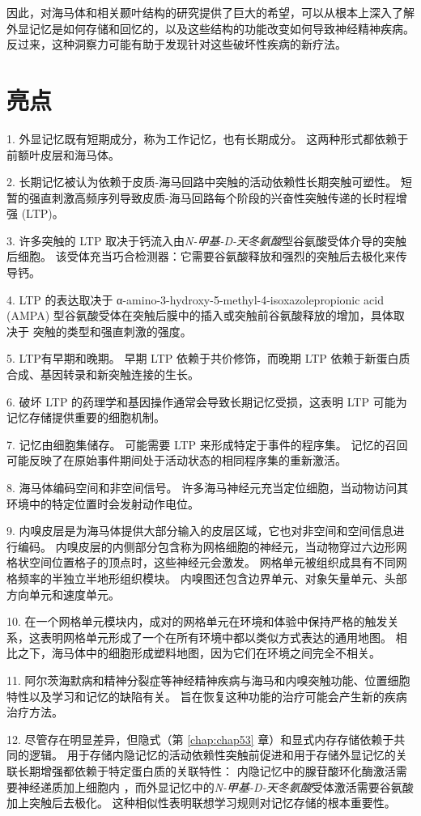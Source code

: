 因此，对海马体和相关颞叶结构的研究提供了巨大的希望，可以从根本上深入了解外显记忆是如何存储和回忆的，以及这些结构的功能改变如何导致神经精神疾病。
反过来，这种洞察力可能有助于发现针对这些破坏性疾病的新疗法。



\section{亮点}

1. 外显记忆既有短期成分，称为工作记忆，也有长期成分。
这两种形式都依赖于前额叶皮层和海马体。 


2. 长期记忆被认为依赖于皮质-海马回路中突触的活动依赖性长期突触可塑性。
短暂的强直刺激高频序列导致皮质-海马回路每个阶段的兴奋性突触传递的长时程增强 (LTP)。


3. 许多突触的 LTP 取决于钙流入由\textit{N-甲基-D-天冬氨酸}型谷氨酸受体介导的突触后细胞。
该受体充当巧合检测器：它需要谷氨酸释放和强烈的突触后去极化来传导钙。 


4. LTP 的表达取决于 α-amino-3-hydroxy-5-methyl-4-isoxazolepropionic acid (AMPA) 型谷氨酸受体在突触后膜中的插入或突触前谷氨酸释放的增加，具体取决于 突触的类型和强直刺激的强度。


5. LTP有早期和晚期。 早期 LTP 依赖于共价修饰，而晚期 LTP 依赖于新蛋白质合成、基因转录和新突触连接的生长。


6. 破坏 LTP 的药理学和基因操作通常会导致长期记忆受损，这表明 LTP 可能为记忆存储提供重要的细胞机制。


7. 记忆由细胞集储存。
可能需要 LTP 来形成特定于事件的程序集。
记忆的召回可能反映了在原始事件期间处于活动状态的相同程序集的重新激活。


8. 海马体编码空间和非空间信号。
许多海马神经元充当定位细胞，当动物访问其环境中的特定位置时会发射动作电位。


9. 内嗅皮层是为海马体提供大部分输入的皮层区域，它也对非空间和空间信息进行编码。
内嗅皮层的内侧部分包含称为网格细胞的神经元，当动物穿过六边形网格状空间位置格子的顶点时，这些神经元会激发。
网格单元被组织成具有不同网格频率的半独立半地形组织模块。
内嗅图还包含边界单元、对象矢量单元、头部方向单元和速度单元。


10. 在一个网格单元模块内，成对的网格单元在环境和体验中保持严格的触发关系，这表明网格单元形成了一个在所有环境中都以类似方式表达的通用地图。
相比之下，海马体中的细胞形成塑料地图，因为它们在环境之间完全不相关。


11. 阿尔茨海默病和精神分裂症等神经精神疾病与海马和内嗅突触功能、位置细胞特性以及学习和记忆的缺陷有关。
旨在恢复这种功能的治疗可能会产生新的疾病治疗方法。 


12. 尽管存在明显差异，但隐式（第 \ref{chap:chap53} 章）和显式内存存储依赖于共同的逻辑。
用于存储内隐记忆的活动依赖性突触前促进和用于存储外显记忆的关联长期增强都依赖于特定蛋白质的关联特性：
内隐记忆中的腺苷酸环化酶激活需要神经递质加上细胞内 ，而外显记忆中的\textit{N-甲基-D-天冬氨酸}受体激活需要谷氨酸 加上突触后去极化。
这种相似性表明联想学习规则对记忆存储的根本重要性。






